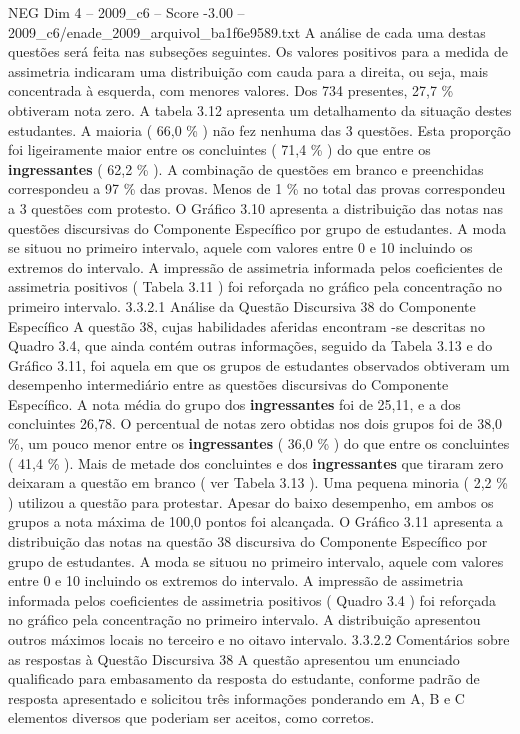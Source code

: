 \begin{textsample}{NEG Dim 4 – 2009\_c6 – Score -3.00 – 2009\_c6/enade\_2009\_arquivol\_ba1f6e9589.txt}
A análise de cada uma destas questões será feita nas subseções seguintes.
Os valores positivos para a medida de assimetria indicaram uma distribuição com cauda para a direita, ou seja, mais concentrada à esquerda, com menores valores.
Dos 734 presentes, 27,7 \% obtiveram nota zero.
A tabela 3.12 apresenta um detalhamento da situação destes estudantes.
A maioria ( 66,0 \% ) não fez nenhuma das 3 questões.
Esta proporção foi ligeiramente maior entre os concluintes ( 71,4 \% ) do que entre os \textbf{ingressantes} ( 62,2 \% ).
A combinação de questões em branco e preenchidas correspondeu a 97 \% das provas.
Menos de 1 \% no total das provas correspondeu a 3 questões com protesto.
O Gráfico 3.10 apresenta a distribuição das notas nas questões discursivas do Componente Específico por grupo de estudantes.
A moda se situou no primeiro intervalo, aquele com valores entre 0 e 10 incluindo os extremos do intervalo.
A impressão de assimetria informada pelos coeficientes de assimetria positivos ( Tabela 3.11 ) foi reforçada no gráfico pela concentração no primeiro intervalo. 3.3.2.1 Análise da Questão Discursiva 38 do Componente Específico A questão 38, cujas habilidades aferidas encontram -se descritas no Quadro 3.4, que ainda contém outras informações, seguido da Tabela 3.13 e do Gráfico 3.11, foi aquela em que os grupos de estudantes observados obtiveram um desempenho intermediário entre as questões discursivas do Componente Específico.
A nota média do grupo dos \textbf{ingressantes} foi de 25,11, e a dos concluintes 26,78.
O percentual de notas zero obtidas nos dois grupos foi de 38,0 \%, um pouco menor entre os \textbf{ingressantes} ( 36,0 \% ) do que entre os concluintes ( 41,4 \% ).
Mais de metade dos concluintes e dos \textbf{ingressantes} que tiraram zero deixaram a questão em branco ( ver Tabela 3.13 ).
Uma pequena minoria ( 2,2 \% ) utilizou a questão para protestar.
Apesar do baixo desempenho, em ambos os grupos a nota máxima de 100,0 pontos foi alcançada.
O Gráfico 3.11 apresenta a distribuição das notas na questão 38 discursiva do Componente Específico por grupo de estudantes.
A moda se situou no primeiro intervalo, aquele com valores entre 0 e 10 incluindo os extremos do intervalo.
A impressão de assimetria informada pelos coeficientes de assimetria positivos ( Quadro 3.4 ) foi reforçada no gráfico pela concentração no primeiro intervalo.
A distribuição apresentou outros máximos locais no terceiro e no oitavo intervalo. 3.3.2.2 Comentários sobre as respostas à Questão Discursiva 38 A questão apresentou um enunciado qualificado para embasamento da resposta do estudante, conforme padrão de resposta apresentado e solicitou três informações ponderando em A, B e C elementos diversos que poderiam ser aceitos, como corretos.

\end{textsample}
